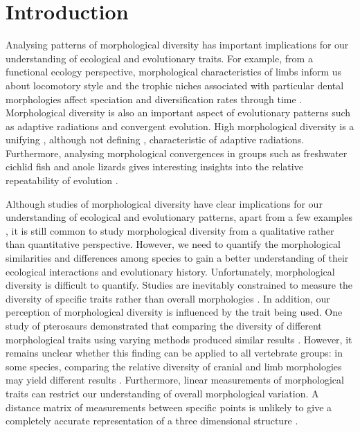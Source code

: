 \chapter{Introduction}
\label{chap:introduction}

\noindent
	Analysing patterns of morphological diversity has important implications for our understanding of ecological and evolutionary traits. For example, from a functional ecology perspective, morphological characteristics of limbs inform us about locomotory style \citep[e.g.][]{Bou1987} and the trophic niches associated with particular dental morphologies affect speciation and diversification rates through time \citep{Price2012}. Morphological diversity is also an important aspect of evolutionary patterns such as adaptive radiations and convergent evolution. High morphological diversity is a unifying \citep{Losos2010a, Olson2009}, although not defining \citep{Glor2010, Olson2009}, characteristic of adaptive radiations. Furthermore, analysing morphological convergences in groups such as freshwater cichlid fish \citep{Muschick2012} and anole lizards \citep{Mahler2013} gives interesting insights into the relative repeatability of evolution \citep{Losos2011}.

	Although studies of morphological diversity have clear implications for our understanding of ecological and evolutionary patterns, apart from a few examples \citep[e.g.][]{Ruta2013, Goswami2011, Brusatte2008}, it is still common to study morphological diversity from a qualitative rather than quantitative perspective. However, we need to quantify the morphological similarities and differences among species to gain a better understanding of their ecological interactions and evolutionary history. Unfortunately, morphological diversity is difficult to quantify. Studies are inevitably constrained to measure the diversity of specific traits rather than overall morphologies \citep{Roy1997}. In addition, our perception of morphological diversity is influenced by the trait being used. One study of pterosaurs demonstrated that comparing the diversity of different morphological traits using varying methods produced similar results \citep{Foth2012}. However, it remains unclear whether this finding can be applied to all vertebrate groups: in some species, comparing the relative diversity of cranial and limb morphologies may yield different results \citep{Foth2012}. Furthermore, linear measurements of morphological traits can restrict our understanding of overall morphological variation. A distance matrix of measurements between specific points is unlikely to give a completely accurate representation of a three dimensional structure \citep{Rohlf1993}.
	
